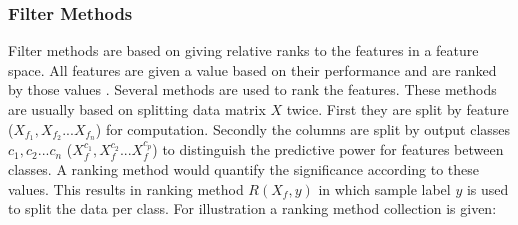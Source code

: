 \documentclass[10pt,a4paper]{report}
\begin{document}
	\subsubsection{Filter Methods}
	\label{FSsubsec:FilterMethods}
	
	Filter methods are based on giving relative ranks to the features in a feature space. All features are given a value based on their performance and are ranked by those values \cite{Duch2006, saeys2007review}. Several methods are used to rank the features. These methods are usually based on splitting data matrix $X$ twice. First they are split by feature ($X_{f_1}, X_{f_2} ... X_{f_n}$) for computation. Secondly the columns are split by output classes $c_1, c_2 ... c_n$ ($X_{f}^{c_1}, X_{f}^{c_2} ... X_{f}^{c_p}$) to distinguish the predictive power for features between classes. A ranking method would quantify the significance according to these values. This results in ranking method $R(X_f, y)$ in which sample label $y$ is used to split the data per class. For illustration a ranking method collection is given:
	
\end{document}
